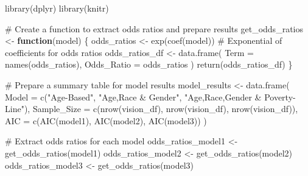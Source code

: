 \documentclass[
  12pt,
]{article}
\newenvironment{Shaded}{\begin{snugshade}}{\end{snugshade}}
\newcommand{\AttributeTok}[1]{\textcolor[rgb]{0.40,0.45,0.13}{#1}}
\newcommand{\CommentTok}[1]{\textcolor[rgb]{0.37,0.37,0.37}{#1}}
\newcommand{\ControlFlowTok}[1]{\textcolor[rgb]{0.00,0.23,0.31}{\textbf{#1}}}
\newcommand{\FunctionTok}[1]{\textcolor[rgb]{0.28,0.35,0.67}{#1}}
\newcommand{\NormalTok}[1]{\textcolor[rgb]{0.00,0.23,0.31}{#1}}
\newcommand{\OtherTok}[1]{\textcolor[rgb]{0.00,0.23,0.31}{#1}}
\newcommand{\StringTok}[1]{\textcolor[rgb]{0.13,0.47,0.30}{#1}}
\begin{document}
\begin{Shaded}
\begin{Highlighting}[]
\FunctionTok{library}\NormalTok{(dplyr)}
\FunctionTok{library}\NormalTok{(knitr)}

\CommentTok{\# Create a function to extract odds ratios and prepare results}
\NormalTok{get\_odds\_ratios }\OtherTok{\textless{}{-}} \ControlFlowTok{function}\NormalTok{(model) \{}
\NormalTok{  odds\_ratios }\OtherTok{\textless{}{-}} \FunctionTok{exp}\NormalTok{(}\FunctionTok{coef}\NormalTok{(model))  }\CommentTok{\# Exponential of coefficients for odds ratios}
\NormalTok{  odds\_ratios\_df }\OtherTok{\textless{}{-}} \FunctionTok{data.frame}\NormalTok{(}
    \AttributeTok{Term =} \FunctionTok{names}\NormalTok{(odds\_ratios),}
    \AttributeTok{Odds\_Ratio =}\NormalTok{ odds\_ratios}
\NormalTok{  )}
  \FunctionTok{return}\NormalTok{(odds\_ratios\_df)}
\NormalTok{\}}

\CommentTok{\# Prepare a summary table for model results}
\NormalTok{model\_results }\OtherTok{\textless{}{-}} \FunctionTok{data.frame}\NormalTok{(}
  \AttributeTok{Model =} \FunctionTok{c}\NormalTok{(}\StringTok{"Age{-}Based"}\NormalTok{, }\StringTok{"Age,Race \& Gender"}\NormalTok{, }\StringTok{"Age,Race,Gender \& Poverty{-}Line"}\NormalTok{),}
  \AttributeTok{Sample\_Size =} \FunctionTok{c}\NormalTok{(}\FunctionTok{nrow}\NormalTok{(vision\_df), }\FunctionTok{nrow}\NormalTok{(vision\_df), }\FunctionTok{nrow}\NormalTok{(vision\_df)),}
  \AttributeTok{AIC =} \FunctionTok{c}\NormalTok{(}\FunctionTok{AIC}\NormalTok{(model1), }\FunctionTok{AIC}\NormalTok{(model2), }\FunctionTok{AIC}\NormalTok{(model3))}
\NormalTok{)}
\end{Highlighting}
\end{Shaded}

\begin{Shaded}
\begin{Highlighting}[]
\CommentTok{\# Extract odds ratios for each model}
\NormalTok{odds\_ratios\_model1 }\OtherTok{\textless{}{-}} \FunctionTok{get\_odds\_ratios}\NormalTok{(model1)}
\NormalTok{odds\_ratios\_model2 }\OtherTok{\textless{}{-}} \FunctionTok{get\_odds\_ratios}\NormalTok{(model2)}
\NormalTok{odds\_ratios\_model3 }\OtherTok{\textless{}{-}} \FunctionTok{get\_odds\_ratios}\NormalTok{(model3)}
\end{Highlighting}
\end{Shaded}
\end{document}
